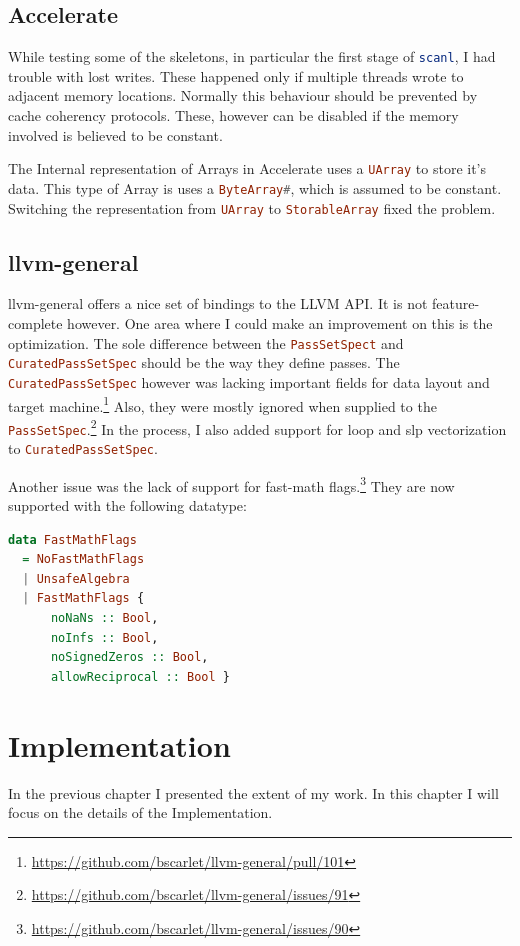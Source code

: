 \documentclass[a4paper,bibliography=totocnumbered,parskip,headsepline]{scrbook}
\begin{document}
\section{Accelerate}
While testing some of the skeletons, in particular the first stage of \lstinline[language=haskell]!scanl!, I had trouble with lost writes.
These happened only if multiple threads wrote to adjacent memory locations.
Normally this behaviour should be prevented by cache coherency protocols.
These, however can be disabled if the memory involved is believed to be constant.

The Internal representation of Arrays in Accelerate uses a \lstinline[language=haskell]!UArray! to store it's data.
This type of Array is uses a \lstinline[language=haskell]!ByteArray#!, which is assumed to be constant.
Switching the representation from \lstinline[language=haskell]!UArray! to \lstinline[language=haskell]!StorableArray! fixed the problem.

\section{llvm-general}
llvm-general offers a nice set of bindings to the LLVM API.
It is not feature-complete however.
One area where I could make an improvement on this is the optimization.
The sole difference between the \lstinline[language=haskell]!PassSetSpect! and \lstinline[language=haskell]!CuratedPassSetSpec! should be the way they define passes.
The \lstinline[language=haskell]!CuratedPassSetSpec! however was lacking important fields for data layout and target machine.\footnote{\url{https://github.com/bscarlet/llvm-general/pull/101}}
Also, they were mostly ignored when supplied to the \lstinline[language=haskell]!PassSetSpec!.\footnote{\url{https://github.com/bscarlet/llvm-general/issues/91}}
In the process, I also added support for loop and slp vectorization to \lstinline[language=haskell]!CuratedPassSetSpec!.

Another issue was the lack of support for fast-math flags.\footnote{\url{https://github.com/bscarlet/llvm-general/issues/90}}
They are now supported with the following datatype:
\begin{lstlisting}[language=haskell]
data FastMathFlags 
  = NoFastMathFlags
  | UnsafeAlgebra
  | FastMathFlags {
      noNaNs :: Bool,
      noInfs :: Bool,
      noSignedZeros :: Bool,
      allowReciprocal :: Bool }
\end{lstlisting}

\chapter{Implementation}
In the previous chapter I presented the extent of my work.
In this chapter I will focus on the details of the Implementation.
\end{document}
